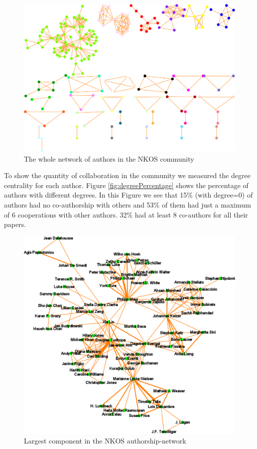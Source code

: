 \documentclass[runningheads,a4paper]{llncs}
\begin{document}
\begin{figure}
	\centering
	\includegraphics[width=1.0\linewidth]{wholeNet}
	\vspace{-0.5em}
	\caption{The whole network of authors in the NKOS community}
	\label{fig:wholenet}
	\vspace{-0.5em}
\end{figure}
To show the quantity of collaboration in the community we measured the degree centrality for each author. Figure \ref{fig:degreePercentage} shows the percentage of authors with different degrees. In this Figure we see that 15\% (with degree=0) of authors had no co-authorship with others and 53\% of them had just a maximum of 6 cooperations with other authors. 32\% had at least 8 co-authors for all their papers.

\begin{figure}[H]
	\centering
	\includegraphics[width=0.9\linewidth]{largestComponent}
	\caption{Largest component in the NKOS authorship-network}
	\label{fig:largestComponent}
\end{figure}
\end{document}
